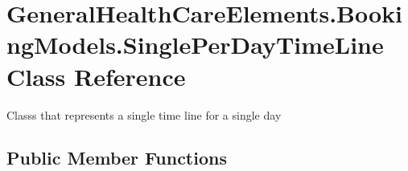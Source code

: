 \hypertarget{class_general_health_care_elements_1_1_booking_models_1_1_single_per_day_time_line}{}\section{General\+Health\+Care\+Elements.\+Booking\+Models.\+Single\+Per\+Day\+Time\+Line Class Reference}
\label{class_general_health_care_elements_1_1_booking_models_1_1_single_per_day_time_line}


Classs that represents a single time line for a single day  


\subsection*{Public Member Functions}
